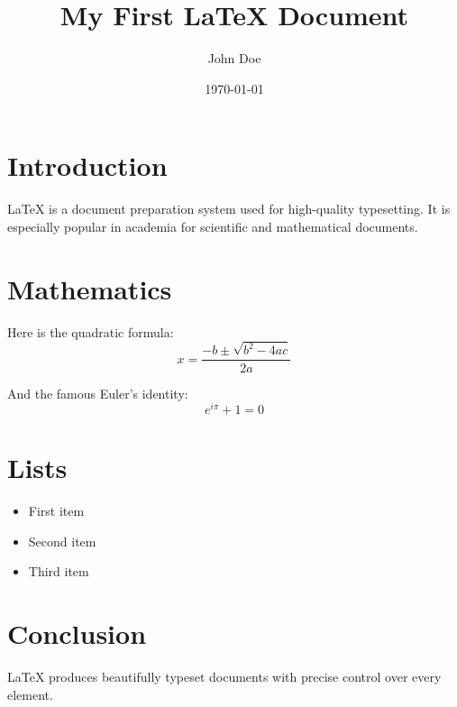 \documentclass{article}
\title{My First LaTeX Document}
\author{John Doe}
\date{\today}
\begin{document}
\maketitle

\section{Introduction}
LaTeX is a document preparation system used for
high-quality typesetting. It is especially popular
in academia for scientific and mathematical documents.

\section{Mathematics}
Here is the quadratic formula:
\begin{equation}
  x = \frac{-b \pm \sqrt{b^2 - 4ac}}{2a}
\end{equation}

And the famous Euler's identity:
\begin{equation}
  e^{i\pi} + 1 = 0
\end{equation}

\section{Lists}
\begin{itemize}
  \item First item
  \item Second item
  \item Third item
\end{itemize}

\section{Conclusion}
LaTeX produces beautifully typeset documents
with precise control over every element.
\end{document}
